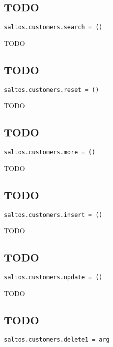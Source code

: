 \documentclass[a4paper]{book}
\begin{document}
\subsection{TODO}

\begin{lstlisting}
saltos.customers.search = ()
\end{lstlisting}

TODO

\hypertarget{toc7}{}
\subsection{TODO}

\begin{lstlisting}
saltos.customers.reset = ()
\end{lstlisting}

TODO

\hypertarget{toc8}{}
\subsection{TODO}

\begin{lstlisting}
saltos.customers.more = ()
\end{lstlisting}

TODO

\hypertarget{toc9}{}
\subsection{TODO}

\begin{lstlisting}
saltos.customers.insert = ()
\end{lstlisting}

TODO

\hypertarget{toc10}{}
\subsection{TODO}

\begin{lstlisting}
saltos.customers.update = ()
\end{lstlisting}

TODO

\hypertarget{toc11}{}
\subsection{TODO}

\begin{lstlisting}
saltos.customers.delete1 = arg
\end{lstlisting}
\end{document}
